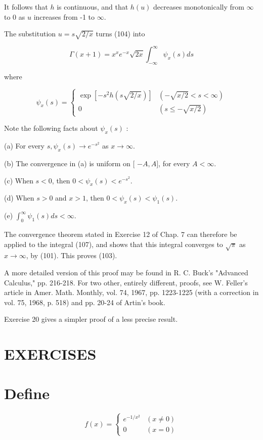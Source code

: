 \documentclass[10pt]{article}
\begin{document}
It follows that $h$ is continuous, and that $h(u)$ decreases monotonically from $\infty$ to 0 as $u$ increases from -1 to $\infty$.

The substitution $u=s \sqrt{2 / x}$ turns (104) into

$$
\Gamma(x+1)=x^{x} e^{-x} \sqrt{2 x} \int_{-\infty}^{\infty} \psi_{x}(s) d s
$$

where

$$
\psi_{x}(s)= \begin{cases}\exp \left[-s^{2} h(s \sqrt{2 / x})\right] & (-\sqrt{x / 2}<s<\infty) \\ 0 & (s \leq-\sqrt{x / 2})\end{cases}
$$

Note the following facts about $\psi_{x}(s)$ :

(a) For every $s, \psi_{x}(s) \rightarrow e^{-s^{2}}$ as $x \rightarrow \infty$.

(b) The convergence in (a) is uniform on [ $-A, A]$, for every $A<\infty$.

(c) When $s<0$, then $0<\psi_{x}(s)<e^{-s^{2}}$.

(d) When $s>0$ and $x>1$, then $0<\psi_{x}(s)<\psi_{1}(s)$.

(e) $\int_{0}^{\infty} \psi_{1}(s) d s<\infty$.

The convergence theorem stated in Exercise 12 of Chap. 7 can therefore be applied to the integral (107), and shows that this integral converges to $\sqrt{\pi}$ as $x \rightarrow \infty$, by (101). This proves (103).

A more detailed version of this proof may be found in R. C. Buck's "Advanced Calculus," pp. 216-218. For two other, entirely different, proofs, see W. Feller's article in Amer. Math. Monthly, vol. 74, 1967, pp. 1223-1225 (with a correction in vol. 75, 1968, p. 518) and pp. 20-24 of Artin's book.

Exercise 20 gives a simpler proof of a less precise result.

\section{EXERCISES}
\section{Define}
$$
f(x)= \begin{cases}e^{-1 / x^{2}} & (x \neq 0) \\ 0 & (x=0)\end{cases}
$$
\end{document}
